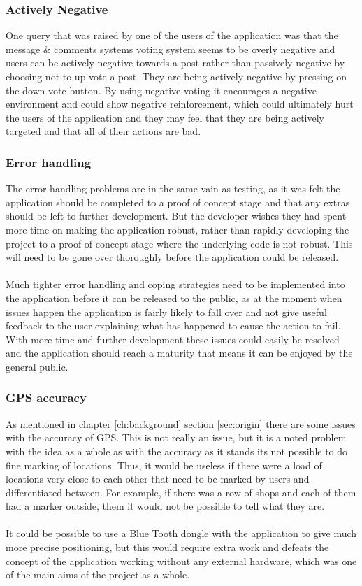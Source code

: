 \subsubsection{Actively Negative}

One query that was raised by one of the users of the application was that the message \& comments systems voting system seems to be overly negative and users can be actively negative towards a post rather than passively negative by choosing not to up vote a post. They are being actively negative by pressing on the down vote button. By using negative voting it encourages a negative environment and could show negative reinforcement, which could ultimately hurt the users of the application and they may feel that they are being actively targeted and that all of their actions are bad.

\subsubsection{Error handling}

The error handling problems are in the same vain as testing, as it was felt the application should be completed to a proof of concept stage and that any extras should be left to further development. But the developer wishes they had spent more time on making the application robust, rather than rapidly developing the project to a proof of concept stage where the underlying code is not robust. This will need to be gone over thoroughly before the application could be released.\\
\\
Much tighter error handling and coping strategies need to be implemented into the application before it can be released to the public, as at the moment when issues happen the application is fairly likely to fall over and not give useful feedback to the user explaining what has happened to cause the action to fail. With more time and further development these issues could easily be resolved and the application should reach a maturity that means it can be enjoyed by the general public.

\subsubsection{GPS accuracy}

As mentioned in chapter \ref{ch:background} section \ref{sec:origin} there are some issues with the accuracy of GPS. This is not really an issue, but it is a noted problem with the idea as a whole as with the accuracy as it stands its not possible to do fine marking of locations. Thus, it would be useless if there were a load of locations very close to each other that need to be marked by users and differentiated between. For example, if there was a row of shops and each of them had a marker outside, them it would not be possible to tell what they are.\\
\\
It could be possible to use a Blue Tooth dongle with the application to give much more precise positioning, but this would require extra work and defeats the concept of the application working without any external hardware, which was one of the main aims of the project as a whole.

